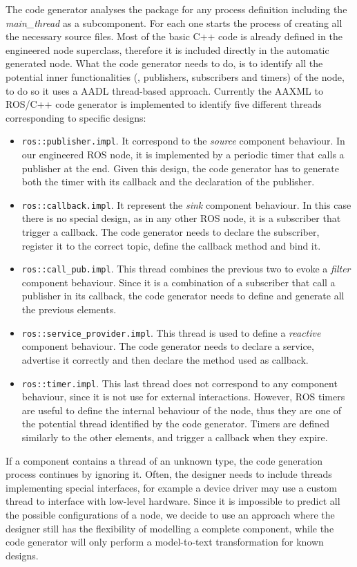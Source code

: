 The code generator analyses the package for any process definition including the \textit{main\_thread} as a subcomponent. For each one starts the process of creating all the necessary source files. Most of the basic C++ code is already defined in the engineered node superclass, therefore it is included directly in the automatic generated node. What the code generator needs to do, is to identify all the potential inner functionalities (\ie, publishers, subscribers and timers) of the node, to do so it uses a AADL thread-based approach. Currently the AAXML to ROS/C++ code generator is implemented to identify five different threads corresponding to specific designs:
\begin{itemize}
\item \texttt{ros::publisher.impl}. It correspond to the \textit{source} component behaviour. In our  engineered ROS node, it is implemented by a periodic timer that calls a publisher at the end. Given this design, the code generator has to generate both the timer with its callback and the declaration of the publisher.
\item \texttt{ros::callback.impl}. It represent the \textit{sink} component behaviour. In this case there is no special design, as in any other ROS node, it is a subscriber that trigger a callback. The code generator needs to declare the subscriber, register it to the correct topic, define the callback method and bind it.
\item \texttt{ros::call\_pub.impl}. This thread combines the previous two to evoke a \textit{filter} component behaviour. Since it is a combination of a subscriber that call a publisher in its callback, the code generator needs to define and generate all the previous elements.
\item \texttt{ros::service\_provider.impl}. This thread is used to define a \textit{reactive} component behaviour. The code generator needs to declare a service, advertise it correctly and then declare the method used as callback.
\item \texttt{ros::timer.impl}. This last thread does not correspond to any component behaviour, since it is not use for external interactions. However, ROS timers are useful to define the internal behaviour of the node, thus they are one of the potential thread identified by the code generator. Timers are defined similarly to the other elements, and trigger a callback when they expire.
\end{itemize}
If a component contains a thread of an unknown type, the code generation process continues by ignoring it. Often, the designer needs to include threads implementing special interfaces, for example a device driver may use a custom thread to interface with low-level hardware. Since it is impossible to predict all the possible configurations of a node, we decide to use an approach where the designer still has the flexibility of modelling a complete component, while the code generator will only perform a model-to-text transformation for known designs.

